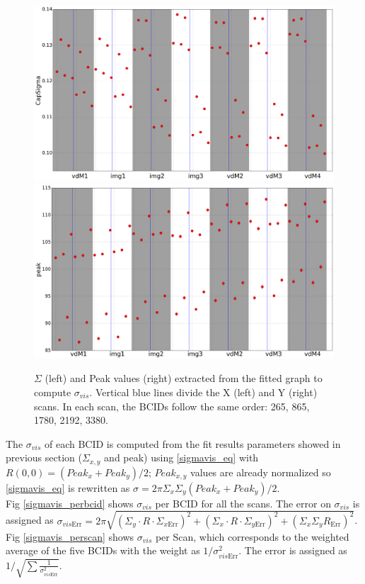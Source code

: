 \begin{center}
  \begin{figure}[ht]
    \centering
    \includegraphics[width=.49\textwidth]{Chapter4/plots_thesis/CapSigma_Poly2G.png}
    \includegraphics[width=.49\textwidth]{Chapter4/plots_thesis/peak_Poly2G.png}
    \caption[$\Sigma$ and peak values for all scan pairs]{$\Sigma$ (left) and Peak values (right) extracted from the fitted graph to compute $\sigma_{vis}$.  Vertical blue lines divide the X (left) and Y (right) scans. In each scan, the BCIDs follow the same order: 265, 865, 1780, 2192, 3380.} %
    \label{capsigma_peak}
  \end{figure}
\end{center}
The $\sigma_{vis}$ of each BCID is computed from the fit results parameters showed in previous section ($\Sigma_{x,y}$ and peak) using \ref{sigmavis_eq} with  $R(0,0)=(Peak_{x}+Peak_{y})/2$; $Peak_{x,y}$ values are already normalized so \ref{sigmavis_eq} is rewritten as $\sigma= 2\pi \Sigma_{x} \Sigma_{y} (Peak_{x}+Peak_{y})/2$.\\
Fig \ref{sigmavis_perbcid} shows  $\sigma_{vis}$ per BCID for all the scans. The error on $\sigma_{vis}$ is assigned as $\sigma_{vis\text{Err}}= 2 \pi \sqrt{ (\Sigma_{y} \cdot R \cdot \Sigma_{x\text{Err}})^{2} + (\Sigma_{x} \cdot R \cdot \Sigma_{y \text{Err}})^{2} + (\Sigma_{x} \Sigma_{y} R_{\text{Err}})^{2} }$.\\ %
Fig \ref{sigmavis_perscan} shows $\sigma_{vis}$ per Scan, which corresponds to the weighted average of the five BCIDs with the weight as $1/\sigma_{vis\text{Err}}^{2}$. The error is assigned as $1/\sqrt{\sum \frac{1}{\sigma_{vis\text{Err}}^{2}}}$.\\

